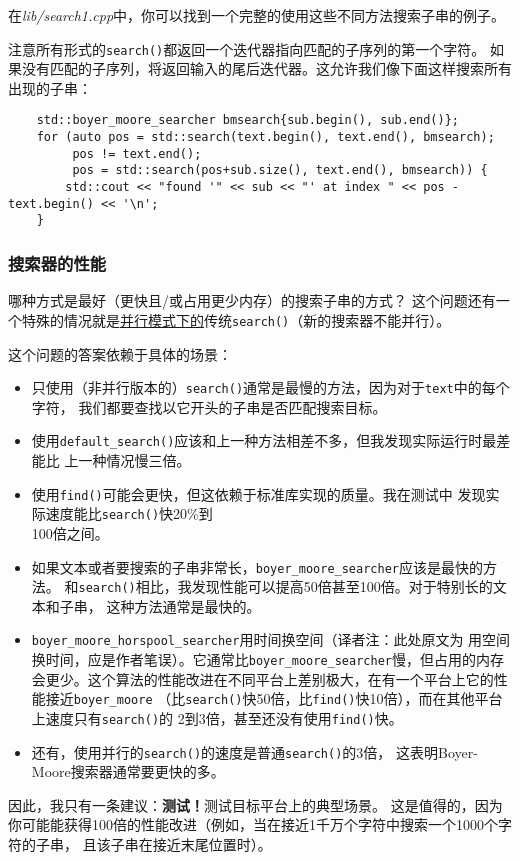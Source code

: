 在\emph{lib/search1.cpp}中，你可以找到一个完整的使用这些不同方法搜索子串的例子。

注意所有形式的\texttt{search()}都返回一个迭代器指向匹配的子序列的第一个字符。
如果没有匹配的子序列，将返回输入的尾后迭代器。这允许我们像下面这样搜索所有出现的子串：
\begin{lstlisting}
    std::boyer_moore_searcher bmsearch{sub.begin(), sub.end()};
    for (auto pos = std::search(text.begin(), text.end(), bmsearch);
         pos != text.end();
         pos = std::search(pos+sub.size(), text.end(), bmsearch)) {
        std::cout << "found '" << sub << "' at index " << pos - text.begin() << '\n';
    }
\end{lstlisting}

\subsubsection{搜索器的性能}
哪种方式是最好（更快且/或占用更少内存）的搜索子串的方式？
这个问题还有一个特殊的情况就是\hyperref[ch22]{并行模式下的}传统\texttt{search()}（新的搜索器不能并行）。

这个问题的答案依赖于具体的场景：
\begin{itemize}
    \item 只使用（非并行版本的）\texttt{search()}通常是最慢的方法，因为对于\texttt{text}中的每个字符，
    我们都要查找以它开头的子串是否匹配搜索目标。
    \item 使用\texttt{default\_search()}应该和上一种方法相差不多，但我发现实际运行时最差能比
    上一种情况慢三倍。
    \item 使用\texttt{find()}可能会更快，但这依赖于标准库实现的质量。我在测试中
    发现实际速度能比\texttt{search()}快20\%到\\
    100倍之间。
    \item 如果文本或者要搜索的子串非常长，\texttt{boyer\_moore\_searcher}应该是最快的方法。
    和\texttt{search()}相比，我发现性能可以提高50倍甚至100倍。对于特别长的文本和子串，
    这种方法通常是最快的。
    \item \texttt{boyer\_moore\_horspool\_searcher}用时间换空间（译者注：此处原文为
    用空间换时间，应是作者笔误）。它通常比\texttt{boyer\_moore\_searcher}慢，但占用的内存
    会更少。这个算法的性能改进在不同平台上差别极大，在有一个平台上它的性能接近\texttt{boyer\_moore}
    （比\texttt{search()}快50倍，比\texttt{find()}快10倍），而在其他平台上速度只有\texttt{search()}的
    2到3倍，甚至还没有使用\texttt{find()}快。
    \item 还有，使用并行的\texttt{search()}的速度是普通\texttt{search()}的3倍，
    这表明Boyer-Moore搜索器通常要更快的多。
\end{itemize}
因此，我只有一条建议：\textbf{测试！}测试目标平台上的典型场景。
这是值得的，因为你可能能获得100倍的性能改进（例如，当在接近1千万个字符中搜索一个1000个字符的子串，
且该子串在接近末尾位置时）。

